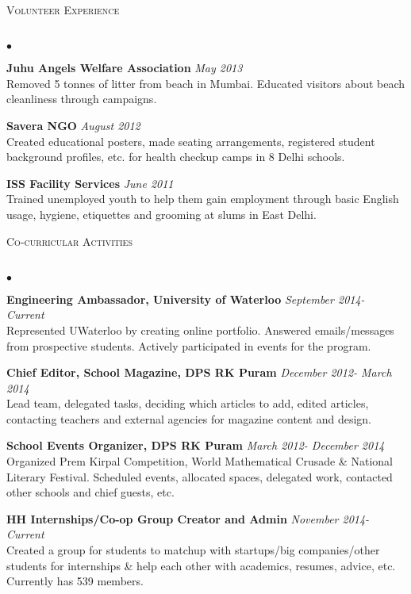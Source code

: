 \documentclass{article}
\newcommand{\lineunder}{\vspace*{-8pt} \\ \hspace*{-18pt} \hrulefill \\}
\newcommand{\header}[1]{{\hspace*{-15pt}\vspace*{6pt} \textsc{#1}} \vspace*{-6pt} \lineunder}
\newenvironment{achievements}{\begin{list}{$\bullet$}{\topsep 0pt \itemsep -1.5pt \leftmargin 5pt}}{\vspace*{4pt}\end{list}}
\begin{document}
\vspace{7pt}

\header{\normalsize Volunteer Experience}
\begin{achievements}
\item \textbf{Juhu Angels Welfare Association}   \hfill \textit{May 2013}
\\Removed 5 tonnes of litter from beach in Mumbai. Educated visitors about beach cleanliness through campaigns.
\item \textbf{Savera NGO}     \hfill \textit{August 2012}
\\Created educational posters, made seating arrangements, registered student background profiles, etc. for health checkup camps in 8 Delhi schools.
\item \textbf{ISS Facility Services}    \hfill \textit{June 2011}
\\Trained unemployed youth to help them gain employment through basic English usage, hygiene, etiquettes and grooming at slums in East Delhi.
\end{achievements}

\vspace{7pt}

\header{\normalsize Co-curricular Activities}
\begin{achievements}
\item \textbf{Engineering Ambassador, University of Waterloo} \hfill \textit {September 2014- Current}
\\ Represented UWaterloo by creating online portfolio. Answered emails/messages from prospective students. Actively participated in events for the program.
\item \textbf{Chief Editor, School Magazine, DPS RK Puram} \hfill \textit {December 2012- March 2014}
\\ Lead team, delegated tasks, deciding which articles to add, edited articles, contacting teachers and external agencies for magazine content and design.
\item \textbf{School Events Organizer, DPS RK Puram}  \hfill \textit {March 2012- December 2014}
\\ Organized Prem Kirpal Competition, World Mathematical Crusade \& National Literary Festival. Scheduled events, allocated spaces, delegated work, contacted other schools and chief guests, etc.
\item \textbf{HH Internships/Co-op Group Creator and Admin} \hfill \textit {November 2014- Current}
\\ Created a group for students to matchup with startups/big companies/other students for internships \& help each other with academics, resumes, advice, etc. Currently has 539 members.
\end{achievements}
\end{document}
